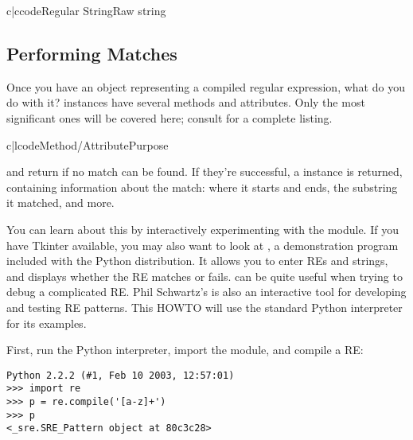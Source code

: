 \documentclass{howto}
\begin{document}
\begin{tableii}{c|c}{code}{Regular String}{Raw string}
\end{tableii}

\subsection{Performing Matches}

Once you have an object representing a compiled regular expression,
what do you do with it?   instances have several
methods and attributes.  Only the most significant ones will be
covered here; consult  for a
complete listing.

\begin{tableii}{c|l}{code}{Method/Attribute}{Purpose}
\end{tableii}

 and  return  if no match
can be found.  If they're successful, a  instance is
returned, containing information about the match: where it starts and
ends, the substring it matched, and more.

You can learn about this by interactively experimenting with the
 module.  If you have Tkinter available, you may also want
to look at , a demonstration program
included with the Python distribution.  It allows you to enter REs and
strings, and displays whether the RE matches or fails.
 can be quite useful when trying to debug a
complicated RE.  Phil Schwartz's
 is also an interactive
tool for developing and testing RE patterns.  This HOWTO will use the
standard Python interpreter for its examples.

First, run the Python interpreter, import the  module, and
compile a RE:

\begin{verbatim}
Python 2.2.2 (#1, Feb 10 2003, 12:57:01)
>>> import re
>>> p = re.compile('[a-z]+')
>>> p
<_sre.SRE_Pattern object at 80c3c28>
\end{verbatim}
\end{document}
